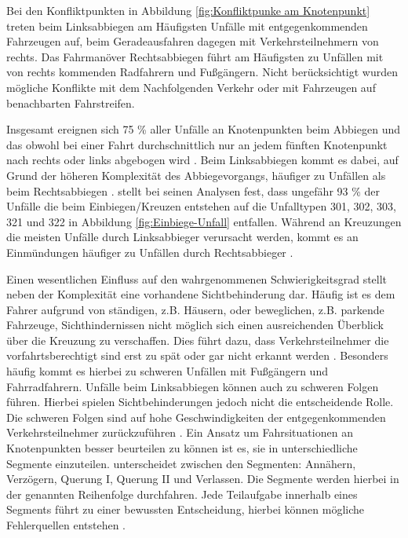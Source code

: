 Bei den Konfliktpunkten in Abbildung \ref{fig:Konfliktpunke am Knotenpunkt} treten beim Linksabbiegen am Häufigsten Unfälle mit entgegenkommenden Fahrzeugen auf, beim Geradeausfahren dagegen mit Verkehrsteilnehmern von rechts. Das Fahrmanöver Rechtsabbiegen führt am Häufigsten zu Unfällen mit von rechts kommenden Radfahrern und Fußgängern. Nicht berücksichtigt wurden mögliche Konflikte mit dem Nachfolgenden Verkehr oder mit Fahrzeugen auf benachbarten Fahrstreifen.

Insgesamt ereignen sich 75 \% aller Unfälle an Knotenpunkten beim Abbiegen und das obwohl bei einer Fahrt durchschnittlich nur an jedem fünften Knotenpunkt nach rechts oder links abgebogen wird \parencite[S. 101-102]{Gerstenberger.17.02.2015}. Beim Linksabbiegen kommt es dabei, auf Grund der höheren Komplexität des Abbiegevorgangs, häufiger zu Unfällen als beim Rechtsabbiegen \parencite[S. 117]{Grundl.2005}. \Textcite[S. 15]{Mages.2008} stellt bei seinen Analysen fest, dass ungefähr 93 \% der Unfälle die beim Einbiegen/Kreuzen entstehen auf die Unfalltypen 301, 302, 303, 321 und 322 in Abbildung \ref{fig:Einbiege-Unfall} entfallen. Während an Kreuzungen die meisten Unfälle durch Linksabbieger verursacht werden, kommt es an Einmündungen häufiger zu Unfällen durch Rechtsabbieger \parencite[S. 102-103] {Gerstenberger.17.02.2015}.

Einen wesentlichen Einfluss auf den wahrgenommenen Schwierigkeitsgrad stellt neben der Komplexität eine vorhandene Sichtbehinderung dar. Häufig ist es dem Fahrer aufgrund von ständigen, z.B. Häusern, oder beweglichen, z.B. parkende Fahrzeuge, Sichthindernissen nicht möglich sich einen ausreichenden Überblick über die Kreuzung zu verschaffen. Dies führt dazu, dass Verkehrsteilnehmer die vorfahrtsberechtigt sind erst zu spät oder gar nicht erkannt werden \parencite[S. 9]{Mages.2008}. Besonders häufig kommt es hierbei zu schweren Unfällen mit Fußgängern und Fahrradfahrern. Unfälle beim Linksabbiegen können auch zu schweren Folgen führen. Hierbei spielen Sichtbehinderungen jedoch nicht die entscheidende Rolle. Die schweren Folgen sind auf  hohe Geschwindigkeiten der entgegenkommenden Verkehrsteilnehmer zurückzuführen \parencite[S. 417]{AbdelAty.2005}. Ein Ansatz um Fahrsituationen an Knotenpunkten besser beurteilen zu können ist es, sie in unterschiedliche Segmente einzuteilen. \Textcite[S. 112]{Gerstenberger.17.02.2015} unterscheidet zwischen den Segmenten: Annähern, Verzögern, Querung I, Querung II und Verlassen. Die Segmente werden hierbei in der genannten Reihenfolge durchfahren. Jede Teilaufgabe innerhalb eines Segments führt zu einer bewussten Entscheidung, hierbei können mögliche Fehlerquellen entstehen \parencite[S. 25]{Gerstenberger.17.02.2015}. %

